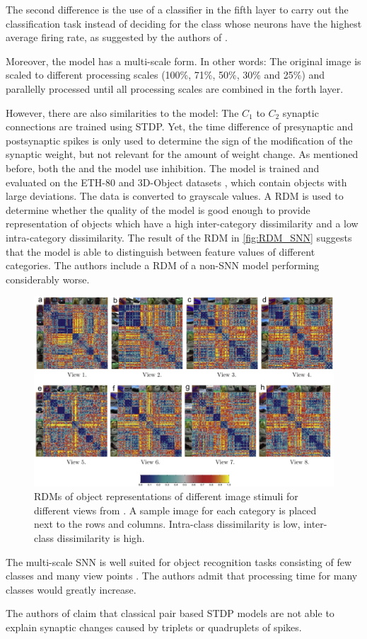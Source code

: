 The second difference is the use of a classifier in the fifth layer to carry out the classification task instead of deciding for the class whose neurons have the highest average firing rate, 
as suggested by the authors of \cite{SNN}.

Moreover, the model has a multi-scale form.
In other words: 
The original image is scaled to different processing scales (100\%, 71\%, 50\%, 30\% and 25\%) and parallelly processed until all processing scales are combined in the forth layer.

However, there are also similarities to the \cite{SNN} model:
The $C_1$ to $C_2$ synaptic connections are trained using \ac{STDP}.
Yet, the time difference of presynaptic and postsynaptic spikes is only used to determine the sign of the modification of the synaptic weight, but not relevant for the amount of weight change.
As mentioned before, both the \cite{multi_scale_STDP} and the \cite{SNN} model use inhibition.
%
The \cite{multi_scale_STDP} model is trained and evaluated on the ETH-80 and 3D-Object datasets \cite{multi_scale_STDP}, which contain objects with large deviations.
The data is converted to grayscale values.
A \ac{RDM} is used to determine whether the quality of the model is good enough to provide representation of objects which have a high inter-category dissimilarity and a low intra-category dissimilarity.
The result of the \ac{RDM} in \autoref{fig:RDM_SNN} suggests that the model is able to distinguish between feature values of different categories.
The authors include a \ac{RDM} of a non-\ac{SNN} model performing considerably worse.
%
\begin{figure}[htbp]
    \center
    \includegraphics[width=\textwidth]{pictures/inter_intra_category_dissimilarity.jpg}
    \caption{\acp{RDM} of object representations of different image stimuli for different views from \cite{multi_scale_STDP}.
    A sample image for each category is placed next to the rows and columns.
    Intra-class dissimilarity is low, inter-class dissimilarity is high.}
    \label{fig:RDM_SNN}
\end{figure}
%
The multi-scale \ac{SNN} is well suited for object recognition tasks consisting of few classes and many view points \cite{multi_scale_STDP}.
The authors admit that processing time for many classes would greatly increase.

The authors of \cite{STDP_triplet} claim that classical pair based \ac{STDP} models 
are not able to explain synaptic changes caused by triplets or quadruplets of spikes.